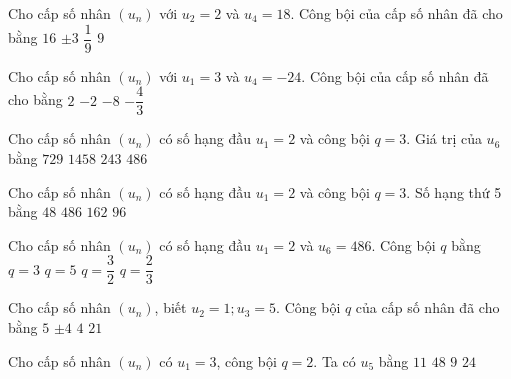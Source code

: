 \begin{ex}%
	Cho cấp số nhân $\left(u_n\right)$ với $u_2=2$ và $u_4=18$. Công bội của cấp số nhân đã cho bằng
	\choice
		{$16$}
		{\True $\pm 3$}
		{$\dfrac{1}{9}$}
		{$9$}
\end{ex}
\begin{ex}%
	Cho cấp số nhân $\left(u_n\right)$ với $u_1=3$ và $u_4=-24$. Công bội của cấp số nhân đã cho bằng
	\choice
		{$2$}
		{\True $-2$}
		{$-8$}
		{$-\dfrac{4}{3}$}
\end{ex}
\begin{ex}%
	Cho cấp số nhân $\left(u_n\right)$ có số hạng đầu $u_1=2$ và công bội $q=3$. Giá trị của $u_6$ bằng
	\choice
		{$729$}
		{$1458$}
		{$243$}
		{\True $486$}
\end{ex}
\begin{ex}%
	Cho cấp số nhân $\left(u_n\right)$ có số hạng đầu $u_1=2$ và công bội $q=3$. Số hạng thứ 5 bằng
	\choice
		{$48$}
		{$486$}
		{\True $162$}
		{$96$}
\end{ex}
\begin{ex}%
	Cho cấp số nhân $\left(u_n\right)$ có số hạng đầu $u_1=2$ và $u_6=486$. Công bội $q$ bằng
	\choice
		{\True  $q=3$}
		{$q=5$}
		{$q=\dfrac{3}{2}$}
		{$q=\dfrac{2}{3}$}
\end{ex}
\begin{ex}%
	Cho cấp số nhân $\left(u_n \right)$, biết $u_2=1; u_3=5$. Công bội $q$ của cấp số nhân đã cho bằng
	\choice
		{\True $5$}
		{$\pm 4$}
		{$4$}
		{$21$}
\end{ex}
\begin{ex}%
	Cho cấp số nhân $\left(u_n\right)$ có $u_1=3$, công bội $q=2$. Ta có $u_5$ bằng
	\choice
		{$11$}
		{\True $48$}
		{$9$}
		{$24$}
\end{ex}
